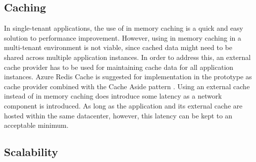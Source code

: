 \subsection{Caching}

In single-tenant applications, the use of in memory caching is a quick and easy solution to performance improvement. However, using in memory caching in a multi-tenant environment is not viable, since cached data might need to be shared across multiple application instances. In order to address this, an external cache provider has to be used for maintaining cache data for all application instances. Azure Redis Cache  is suggested for implementation in the prototype  as cache provider combined with the Cache Aside pattern \cite{Homer2014}. Using an external cache instead of in memory caching does introduce some latency as a network component is introduced. As long as the application and its external cache are hosted within the same datacenter, however, this latency can be kept to an acceptable minimum.


\subsection{Scalability}
\label{sec:scalability}

